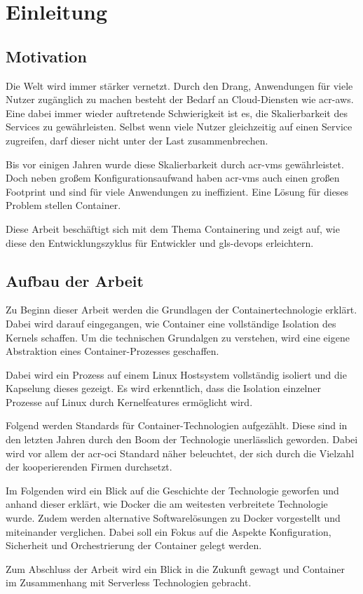 \chapter{Einleitung}
\label{chap:einleitung}

\section{Motivation}
\label{sec:motivation}
Die Welt wird immer stärker vernetzt. Durch den Drang, Anwendungen für viele Nutzer zugänglich zu machen besteht der Bedarf an Cloud-Diensten wie \gls{acr-aws}.
Eine dabei immer wieder auftretende Schwierigkeit ist es, die Skalierbarkeit des Services zu gewährleisten. Selbst wenn viele Nutzer gleichzeitig auf einen Service zugreifen, darf dieser nicht unter der Last zusammenbrechen.

Bis vor einigen Jahren wurde diese Skalierbarkeit durch \glspl{acr-vm} gewährleistet. Doch neben großem Konfigurationsaufwand haben \glspl{acr-vm} auch einen großen Footprint und sind für viele  Anwendungen zu ineffizient. Eine Lösung für dieses Problem stellen Container.

Diese Arbeit beschäftigt sich mit dem Thema Containering und zeigt auf, wie diese den Entwicklungszyklus für Entwickler und \gls{gls-devops} erleichtern.

\section{Aufbau der Arbeit}
\label{sec:aufbau}
Zu Beginn dieser Arbeit werden die Grundlagen der Containertechnologie erklärt. Dabei wird darauf eingegangen, wie Container eine vollständige Isolation des Kernels schaffen. Um die technischen Grundalgen zu verstehen, wird eine eigene Abstraktion eines Container-Prozesses geschaffen.

Dabei wird ein Prozess auf einem Linux Hostsystem vollständig isoliert und die Kapselung dieses gezeigt. Es wird erkenntlich, dass die Isolation einzelner Prozesse auf Linux durch Kernelfeatures ermöglicht wird.

Folgend werden Standards für Container-Technologien aufgezählt. Diese sind in den letzten Jahren durch den Boom der Technologie unerlässlich geworden. Dabei wird vor allem der \gls{acr-oci} Standard näher beleuchtet, der sich durch die Vielzahl der kooperierenden Firmen durchsetzt.

Im Folgenden wird ein Blick auf die Geschichte der Technologie geworfen und anhand dieser erklärt, wie Docker die am weitesten verbreitete Technologie wurde. Zudem werden alternative Softwarelösungen zu Docker vorgestellt und miteinander verglichen. Dabei soll ein Fokus auf die Aspekte Konfiguration, Sicherheit und Orchestrierung der Container gelegt werden.

Zum Abschluss der Arbeit wird ein Blick in die Zukunft gewagt und Container im Zusammenhang mit Serverless Technologien gebracht.
